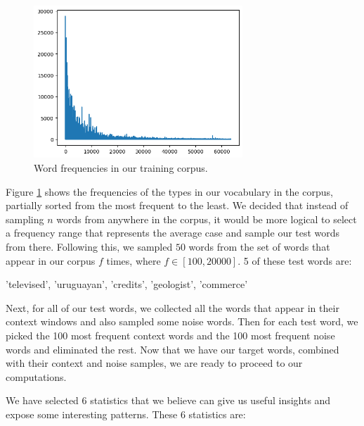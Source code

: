 \begin{figure}[ht]
    \centering
    \includegraphics[width=0.7\textwidth]{img/word_counts.png}
    \caption{Word frequencies in our training corpus.}
    \label{fig:word_counts}
\end{figure}

Figure \ref{fig:word_counts} shows the frequencies of the types in our vocabulary in the corpus, partially sorted from the most frequent to the least. We decided that instead of sampling $n$ words from anywhere in the corpus, it would be more logical to select a frequency range that represents the average case and sample our test words from there. Following this, we sampled $50$ words from the set of words that appear in our corpus $f$ times, where $f \in [100, 20000]$. 5 of these test words are:

\begin{displayquote}
\centering
'televised', 'uruguayan', 'credits', 'geologist', 'commerce'
\end{displayquote}

Next, for all of our test words, we collected all the words that appear in their context windows and also sampled some noise words. Then for each test word, we picked the 100 most frequent context words and the 100 most frequent noise words and eliminated the rest. Now that we have our target words, combined with their context and noise samples, we are ready to proceed to our computations.

We have selected 6 statistics that we believe can give us useful insights and expose some interesting patterns. These 6 statistics are:

